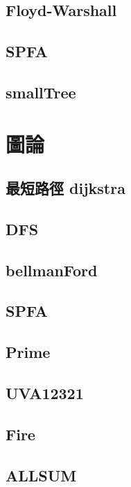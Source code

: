     \subsection{Floyd-Warshall}
        
    \subsection{SPFA}
        
    \subsection{smallTree}
        

\section{圖論}
    \subsection{最短路徑 dijkstra}
        
    \subsection{DFS}
        
    \subsection{bellmanFord}
        
    \subsection{SPFA}
          
    \subsection{Prime}
        
    \subsection{UVA12321}
        
    \subsection{Fire}
        
    \subsection{ALLSUM}
        
